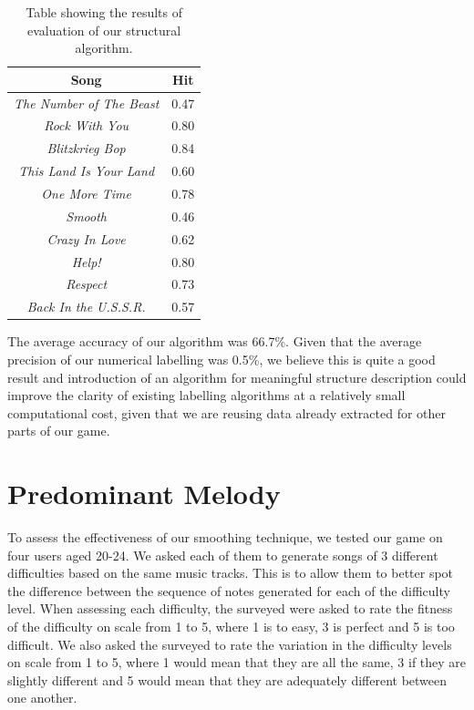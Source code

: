 \begin{table}
\begin{center}
\begin{tabular}{| c | c |} \hline 
Song  											&  Hit		\\ \hline \hline
\textit{The Number of The Beast} 	&  0.47	\\ \hline
\textit{Rock With You}						&	0.80	\\ \hline
\textit{Blitzkrieg Bop} 						&	0.84	\\ \hline
\textit{This Land Is Your Land} 		&	0.60	\\ \hline
\textit{One More Time}					&	0.78	\\ \hline
\textit{Smooth}								&	0.46	\\ \hline
\textit{Crazy In Love}						&	0.62	\\ \hline
\textit{Help!}									&	0.80	\\ \hline
\textit{Respect}								&	0.73	\\ \hline
\textit{Back In the U.S.S.R.}				&	0.57	\\ \hline

\end{tabular}
\caption{Table showing the results of evaluation of our structural algorithm.}
\label{table:labelresults}
\end{center}
\end{table}

The average accuracy of our algorithm was 66.7\%. Given that the average precision of our numerical labelling was 0.5\%, we believe this is quite a good result and introduction of an algorithm for meaningful structure description could improve the clarity of existing labelling algorithms at a relatively small computational cost, given that we are reusing data already extracted for other parts of our game.

\vspace{20pt}

\section{Predominant Melody}

To assess the effectiveness of our smoothing technique, we tested our game on four users aged 20-24. We asked each of them to generate songs of 3 different difficulties based on the same music tracks. This is to allow them to better spot the difference between the sequence of notes generated for each of the difficulty level. When assessing each difficulty, the surveyed were asked to rate the fitness of the difficulty on scale from 1 to 5, where 1 is to easy, 3 is perfect and 5 is too difficult. We also asked the surveyed to rate the variation in the difficulty levels on scale from 1 to 5, where 1 would mean that they are all the same, 3 if they are slightly different and 5 would mean that they are adequately different between one another. 

